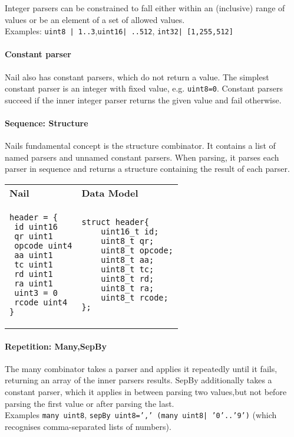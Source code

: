 Integer parsers can be constrained to fall either within an (inclusive) range of values or be an
element of a set of allowed values. \\Examples: \texttt{uint8 | 1..3},\texttt{uint16| ..512},
\texttt{int32| [1,255,512]}

\paragraph{Constant parser}
Nail also has constant parsers, which do not return a value. The simplest constant parser is an
integer with fixed value, e.g. \texttt{uint8=0}. Constant parsers succeed if the inner integer
parser returns the given value and fail otherwise. 


\paragraph{Sequence: Structure}
Nails fundamental concept is the structure combinator. It contains a list of named parsers and
unnamed constant parsers. 
When parsing, it parses each parser in sequence and returns a structure containing the result of
each parser.

\begin{tabular}{ll}
\textbf{Nail} & \textbf{Data Model}\\
\begin{minipage}{2in}
\begin{verbatim}
header = {
 id uint16
 qr uint1
 opcode uint4
 aa uint1 
 tc uint1
 rd uint1
 ra uint1
 uint3 = 0
 rcode uint4
}
\end{verbatim} 
\end{minipage}
 & 
\begin{minipage}{2in}
\begin{verbatim}
struct header{
    uint16_t id;
    uint8_t qr;
    uint8_t opcode;
    uint8_t aa;
    uint8_t tc;
    uint8_t rd;
    uint8_t ra;
    uint8_t rcode;
};
\end{verbatim} 
\end{minipage} 
\\
\end{tabular}
\paragraph{Repetition: Many,SepBy}
The many combinator takes a parser and applies it repeatedly until it fails, returning an array of
the inner parsers results. SepBy additionally takes a constant parser, which it applies in between
parsing two values,but not before parsing the first value or after parsing the last.\\
Examples \texttt{many uint8}, \texttt{sepBy uint8=',' (many uint8| '0'..'9')} (which recognises
comma-separated lists of numbers).

